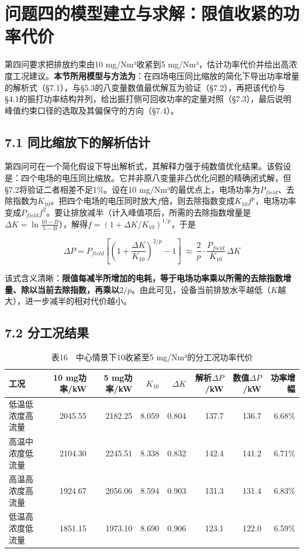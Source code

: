 \documentclass[UTF8,zihao=5,a4paper]{ctexart}
\begin{document}
\section{问题四的模型建立与求解：限值收紧的功率代价}

第四问要求把排放约束由10 mg/Nm³收紧到5 mg/Nm³，估计功率代价并给出高浓度工况建议。\textbf{本节所用模型与方法为}：在四场电压同比缩放的简化下导出功率增量的解析式（§7.1），与§5.3的八变量数值最优解互为验证（§7.2），再把该代价与§4.1的振打功率结构并列，给出振打侧可回收功率的定量对照（§7.3），最后说明峰值约束口径的选取及其偏保守的方向（§7.4）。

\subsection*{7.1 同比缩放下的解析估计}

第四问可在一个简化假设下导出解析式，其解释力强于纯数值优化结果。该假设是：四个电场的电压同比缩放。它并非原八变量非凸优化问题的精确闭式解，但§7.2将验证二者相差不足1\%。设在10 mg/Nm³的最优点上，电场功率为$P_{field}$、去除指数为$K_{10}$。把四个电场的电压同时放大$f$倍，则去除指数变成$K_{10}f^{p}$，电场功率变成$P_{field}f^{2}$。要让排放减半（计入峰值项后，所需的去除指数增量是$\Delta K=\ln\frac{10-B}{5-B}$），解得$f=(1+\Delta K/K_{10})^{1/p}$，于是

\begin{equation}
\Delta P=P_{field}\left[\left(1+\frac{\Delta K}{K_{10}}\right)^{2/p}-1\right]
\ \approx\ \frac{2}{p}\cdot\frac{P_{field}}{K_{10}}\,\Delta K 
\end{equation}

该式含义清晰：\textbf{限值每减半所增加的电耗，等于电场功率乘以所需的去除指数增量、除以当前去除指数，再乘以$2/p$}。由此可见，设备当前排放水平越低（$K$越大），进一步减半的相对代价越小。

\subsection*{7.2 分工况结果}


\begin{table}[htb]
\centering
\caption*{\normalsize 表16　中心情景下10收紧至5 mg/Nm³的分工况功率代价}
\vspace{-2pt}
\begin{tabularx}{\textwidth}{>{\hsize=1.000\hsize\raggedright\arraybackslash}Xrrrrrrr}
\toprule
工况 & 10 mg功率/kW & 5 mg功率/kW & $K_{10}$ & $\Delta K$ & 解析$\Delta P$/kW & 数值$\Delta P$/kW & 功率增幅 \\
\midrule
1 低温低浓度高流量 & 2045.55 & 2182.25 & 8.059 & 0.804 & 137.7 & 136.7 & 6.68\% \\
2 高温中浓度低流量 & 2104.30 & 2245.51 & 8.338 & 0.832 & 142.4 & 141.2 & 6.71\% \\
3 高温高浓度高流量 & 1924.67 & 2056.06 & 8.594 & 0.903 & 131.3 & 131.4 & 6.83\% \\
4 低温高浓度低流量 & 1851.15 & 1973.10 & 8.690 & 0.906 & 123.1 & 122.0 & 6.59\% \\
\bottomrule
\end{tabularx}
\end{table}
\end{document}
